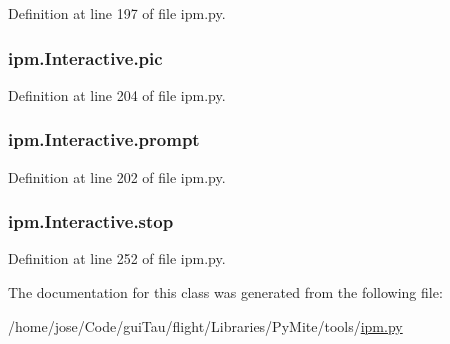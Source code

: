 Definition at line 197 of file ipm.\-py.

\hypertarget{classipm_1_1_interactive_a261360cc196e8ae1c1fe04db82bf0269}{
\subsubsection[{pic}]{\setlength{\rightskip}{0pt plus 5cm}ipm.\-Interactive.\-pic}}\label{classipm_1_1_interactive_a261360cc196e8ae1c1fe04db82bf0269}


Definition at line 204 of file ipm.\-py.

\hypertarget{classipm_1_1_interactive_a964ba8ffe297358a7c06d25529652b09}{
\subsubsection[{prompt}]{\setlength{\rightskip}{0pt plus 5cm}ipm.\-Interactive.\-prompt}}\label{classipm_1_1_interactive_a964ba8ffe297358a7c06d25529652b09}


Definition at line 202 of file ipm.\-py.

\hypertarget{classipm_1_1_interactive_a8c8a00cb8784305a2203b1e7091ca74a}{
\subsubsection[{stop}]{\setlength{\rightskip}{0pt plus 5cm}ipm.\-Interactive.\-stop}}\label{classipm_1_1_interactive_a8c8a00cb8784305a2203b1e7091ca74a}


Definition at line 252 of file ipm.\-py.



The documentation for this class was generated from the following file\-:\begin{DoxyCompactItemize}
\item 
/home/jose/\-Code/gui\-Tau/flight/\-Libraries/\-Py\-Mite/tools/\hyperlink{tools_2ipm_8py}{ipm.\-py}\end{DoxyCompactItemize}
